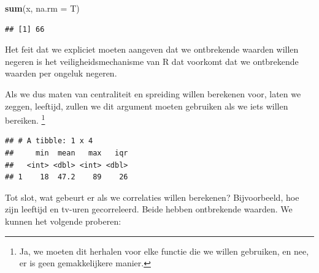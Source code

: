 \documentclass[]{tufte-book}
\newenvironment{Shaded}{}{}
\newcommand{\DataTypeTok}[1]{\textcolor[rgb]{0.56,0.13,0.00}{#1}}
\newcommand{\KeywordTok}[1]{\textcolor[rgb]{0.00,0.44,0.13}{\textbf{#1}}}
\newcommand{\NormalTok}[1]{#1}
\newcommand{\OperatorTok}[1]{\textcolor[rgb]{0.40,0.40,0.40}{#1}}
\newcommand{\StringTok}[1]{\textcolor[rgb]{0.25,0.44,0.63}{#1}}
\begin{document}
\begin{Shaded}
\begin{Highlighting}[]
\KeywordTok{sum}\NormalTok{(x, }\DataTypeTok{na.rm =}\NormalTok{ T)}
\end{Highlighting}
\end{Shaded}

\begin{verbatim}
## [1] 66
\end{verbatim}

Het feit dat we expliciet moeten aangeven dat we ontbrekende waarden willen negeren is het veiligheidsmechanisme van R dat voorkomt dat we ontbrekende waarden per ongeluk negeren.

Als we dus maten van centraliteit en spreiding willen berekenen voor, laten we zeggen, leeftijd, zullen we dit argument moeten gebruiken als we iets willen bereiken. \footnote{Ja, we moeten dit herhalen voor elke functie die we willen gebruiken, en nee, er is geen gemakkelijkere manier.}

\begin{Shaded}
\end{Shaded}

\begin{verbatim}
## # A tibble: 1 x 4
##     min  mean   max   iqr
##   <int> <dbl> <int> <dbl>
## 1    18  47.2    89    26
\end{verbatim}

Tot slot, wat gebeurt er als we correlaties willen berekenen? Bijvoorbeeld, hoe zijn leeftijd en tv-uren gecorreleerd. Beide hebben ontbrekende waarden. We kunnen het volgende proberen:

\begin{Shaded}
\end{Shaded}
\end{document}
